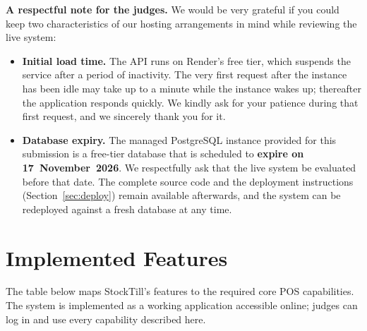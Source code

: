 \documentclass[11pt,a4paper]{article}
\begin{document}
\noindent\textbf{A respectful note for the judges.} We would be very grateful if you could keep two
characteristics of our hosting arrangements in mind while reviewing the live system:
\begin{itemize}[leftmargin=1.4em,itemsep=2pt,topsep=3pt]
  \item \textbf{Initial load time.} The API runs on Render's free tier, which suspends the service
  after a period of inactivity. The very first request after the instance has been idle may take up
  to a minute while the instance wakes up; thereafter the application responds quickly. We kindly
  ask for your patience during that first request, and we sincerely thank you for it.
  \item \textbf{Database expiry.} The managed PostgreSQL instance provided for this submission is a
  free-tier database that is scheduled to \textbf{expire on 17~November~2026}. We respectfully ask
  that the live system be evaluated before that date. The complete source code and the deployment
  instructions (Section~\ref{sec:deploy}) remain available afterwards, and the system can be
  redeployed against a fresh database at any time.
\end{itemize}

\section{Implemented Features}
\label{sec:features}

The table below maps StockTill's features to the required core POS capabilities. The system is
implemented as a working application accessible online; judges can log in and use every capability
described here.
\end{document}
